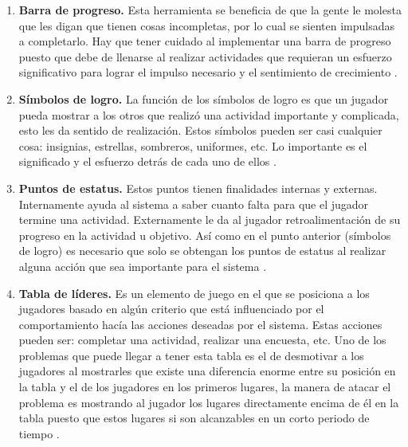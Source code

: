     \begin{enumerate}
        
    \item
    {\bf Barra de progreso.} %
        Esta herramienta se beneficia de que la gente le molesta que les digan que tienen
        cosas incompletas, por lo cual se sienten impulsadas a completarlo. Hay que tener
        cuidado al implementar una barra de progreso puesto que debe de llenarse al realizar
        actividades que requieran un esfuerzo significativo para lograr el impulso necesario
        y el sentimiento de crecimiento \cite[p. 113]{Octalysis}.
        
    \item
    {\bf Símbolos de logro.}
        La función de los símbolos de logro es que un jugador pueda mostrar a los otros
        que realizó una actividad importante y complicada, esto les da sentido de realización.
        Estos símbolos pueden ser casi cualquier cosa: insignias, estrellas, sombreros, uniformes,
        etc. Lo importante es el significado y el esfuerzo detrás de cada uno de ellos
        \cite[p. 117]{Octalysis}.
        
    \item
    {\bf Puntos de estatus.}
        Estos puntos tienen finalidades internas y externas. Internamente ayuda al sistema
        a saber cuanto falta para que el jugador termine una actividad. Externamente le da al
        jugador retroalimentación de su progreso en la actividad u objetivo. Así como en el
        punto anterior (símbolos de logro) es necesario que solo se obtengan los puntos de
        estatus al realizar alguna acción que sea importante para el sistema \cite[p. 118]{Octalysis}.
        
    \item
    {\bf Tabla de líderes.}
        Es un elemento de juego en el que se posiciona a los jugadores basado en algún criterio
        que está influenciado por el comportamiento hacía las acciones deseadas por el sistema.
        Estas acciones pueden ser: completar una actividad, realizar una encuesta, etc. Uno de
        los problemas que puede llegar a tener esta tabla es el de desmotivar a los jugadores
        al mostrarles que existe una diferencia enorme entre su posición en la tabla y el de los
        jugadores en los primeros lugares, la manera de atacar el problema es mostrando al jugador
        los lugares directamente encima de él en la tabla puesto que estos lugares si son
        alcanzables en un corto periodo de tiempo \cite[p. 121]{Octalysis}.
        
    \end{enumerate}
    
